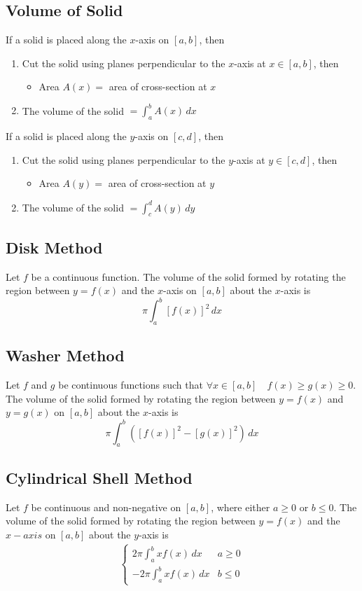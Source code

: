 \documentclass[../ma2002_notes.tex]{subfiles}
\begin{document}
\subsection{Volume of Solid}
If a solid is placed along the \(x\)-axis on \([a,b]\), then
\begin{enumerate}
	\item Cut the solid using planes perpendicular to the \(x\)-axis at \(x\in[a,b]\), then
	\begin{itemize}
		\item Area \(A(x)=\) area of cross-section at \(x\)
	\end{itemize}
	\item The volume of the solid \(=\int_a^bA(x)\,dx\)
\end{enumerate}
If a solid is placed along the \(y\)-axis on \([c,d]\), then
\begin{enumerate}
	\item Cut the solid using planes perpendicular to the \(y\)-axis at \(y\in[c,d]\), then
	\begin{itemize}
		\item Area \(A(y)=\) area of cross-section at \(y\)
	\end{itemize}
	\item The volume of the solid \(=\int_c^dA(y)\,dy\)
\end{enumerate}

\subsection{Disk Method}
Let \(f\) be a continuous function. The volume of the solid formed by rotating the region between \(y=f(x)\) and the \(x\)-axis on \([a,b]\) about the \(x\)-axis is
\[\pi\int_a^b[f(x)]^2\,dx\]

\subsection{Washer Method}
Let \(f\) and \(g\) be continuous functions such that \(\forall x\in[a,b]\quad f(x)\geq g(x)\geq0\). The volume of the solid formed by rotating the region between \(y=f(x)\) and \(y=g(x)\) on \([a,b]\) about the \(x\)-axis is
\[\pi\int_a^b([f(x)]^2-[g(x)]^2)\,dx\]

\subsection{Cylindrical Shell Method}
Let \(f\) be continuous and non-negative on \([a,b]\), where either \(a\geq0\) or \(b\leq0\). The volume of the solid formed by rotating the region between \(y=f(x)\) and the \(x-axis\) on \([a,b]\) about the \(y\)-axis is
\begin{align*}
\begin{cases}
	\displaystyle2\pi\int_a^bxf(x)\,dx & a\geq0\\
	\displaystyle-2\pi\int_a^bxf(x)\,dx & b\leq0
\end{cases}
\end{align*}
\end{document}
